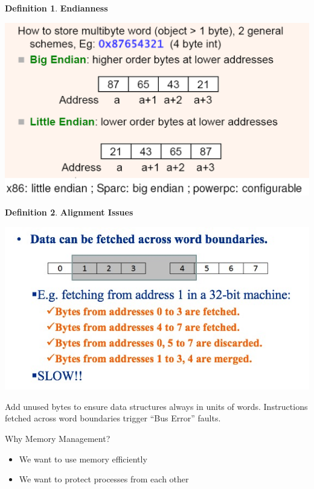 \documentclass[11pt,a4paper]{article}
\theoremstyle{definition}
\newtheorem{definition}{Definition}[section]
\newenvironment{myitemize}
{ \begin{itemize}
    \setlength{\itemsep}{5pt}
    \setlength{\parskip}{0pt}
    \setlength{\parsep}{0pt}     }
{ \end{itemize}                  }
\begin{document}
\begin{minipage}{0.6\linewidth}
	\begin{definition}{\textbf{Endianness}}
	\begin{center}
		\includegraphics[width=1\linewidth]{m4/endianness}
	\end{center}
\end{definition}
\end{minipage}
\begin{minipage}{0.40\linewidth}
	\begin{definition}{\textbf{Alignment Issues}}
	\begin{center}
		\includegraphics[width=1\linewidth]{m4/alignmentIssues}
	\end{center}
	
	Add unused bytes to ensure data structures always in units of words. Instructions fetched across word boundaries trigger ``Bus Error'' faults.
\end{definition}
\end{minipage}

\begin{tcolorbox}
	\textsf{Why Memory Management?}
	\begin{myitemize}
		\item We want to use memory efficiently
		\item We want to protect processes from each other
	\end{myitemize}
\end{tcolorbox}
\end{document}
